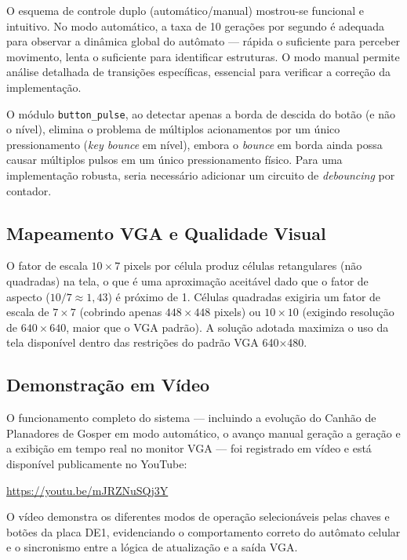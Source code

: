 \documentclass[12pt, a4paper]{article}
\begin{document}
	O esquema de controle duplo (automático/manual) mostrou-se funcional e intuitivo.
	No modo automático, a taxa de 10 gerações por segundo é adequada para observar
	a dinâmica global do autômato --- rápida o suficiente para perceber movimento,
	lenta o suficiente para identificar estruturas. O modo manual permite análise
	detalhada de transições específicas, essencial para verificar a correção da
	implementação.
	
	O módulo \texttt{button\_pulse}, ao detectar apenas a borda de descida do botão
	(e não o nível), elimina o problema de múltiplos acionamentos por um único
	pressionamento (\textit{key bounce} em nível), embora o \textit{bounce} em borda
	ainda possa causar múltiplos pulsos em um único pressionamento físico. Para uma
	implementação robusta, seria necessário adicionar um circuito de
	\textit{debouncing} por contador.
	
	\subsection{Mapeamento VGA e Qualidade Visual}
	
	O fator de escala $10 \times 7$ pixels por célula produz células retangulares
	(não quadradas) na tela, o que é uma aproximação aceitável dado que o fator de
	aspecto ($10/7 \approx 1{,}43$) é próximo de 1. Células quadradas exigiria um
	fator de escala de $7 \times 7$ (cobrindo apenas $448 \times 448$ pixels) ou
	$10 \times 10$ (exigindo resolução de $640 \times 640$, maior que o VGA padrão).
	A solução adotada maximiza o uso da tela disponível dentro das restrições do
	padrão VGA 640$\times$480.
	
	\subsection{Demonstração em Vídeo}
	
	O funcionamento completo do sistema --- incluindo a evolução do Canhão de
	Planadores de Gosper em modo automático, o avanço manual geração a geração
	e a exibição em tempo real no monitor VGA --- foi registrado em vídeo e está
	disponível publicamente no YouTube:
	
	\begin{center}
		\url{https://youtu.be/mJRZNuSQj3Y}
	\end{center}
	
	\noindent O vídeo demonstra os diferentes modos de operação selecionáveis pelas
	chaves e botões da placa DE1, evidenciando o comportamento correto do autômato
	celular e o sincronismo entre a lógica de atualização e a saída VGA.
	
\end{document}
